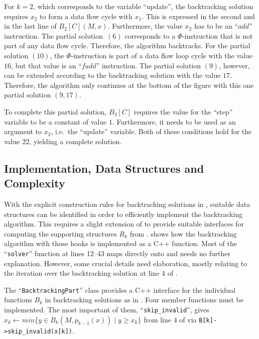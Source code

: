     For $k=2$, which corresponds to the variable ``update'', the backtracking
    solution requires $x_2$ to form a data flow cycle with $x_1$.
    This is expressed  in the second and in the last line of $B_2[C](M,x)$.
    Furthermore, the value $x_2$ has to be an ``$add$'' instruction.
    The partial solution~$(6)$ corresponds to a $\Phi$-instruction that is not
    part of any data flow cycle.
    Therefore, the algorithm backtracks.
    For the partial solution $(10)$, the $\Phi$-instruction is part of a data
    flow loop cycle with the value $16$, but that value is an ``$fadd$''
    instruction.
    The partial solution $(9)$, however, can be extended according to the
    backtracking solution with the value $17$.
    Therefore, the algorithm only continues at the bottom of the figure with
    this one partial solution $(9,17)$.

    To complete this partial solution, $B_3[C]$ requires the value for the
    ``step'' variable to be a constant of value $1$.
    Furthermore, it needs to be used as an argument to $x_2$, i.e.\ the
    ``update'' variable.
    Both of these conditions hold for the value $22$, yielding a complete
    solution.

\subsection{Implementation, Data Structures and Complexity}
\label{subsec:impl}

\begin{figure}[p]
    
\end{figure}

    With the explicit construction rules for backtracking solutions in
    , suitable data structures
    can be identified in order to efficiently implement the
    backtracking algorithm.
    This requires a slight extension of  to provide suitable
    interfaces for computing the supporting structures $R_k$ from
    .
     shows how the backtracking algorithm with those hooks is
    implemented as a C++ function.
    Most of the ``\texttt{solver}'' function at lines 12--43 maps directly onto
     and needs no further explanation.
    However, some crucial details need elaboration, mostly relating to the
    iteration over the backtracking solution at line 4 of .

    The ``\texttt{BacktrackingPart}'' class provides a C++ interface
    for the individual functions $B_k$ in backtracking solutions as in
    .
    Four member functions must be implemented.
    The most important of them, ``\texttt{skip\_invalid}'',
    gives $x_k\gets min\{y\in B_k(M,p_{k-1}(x))\mid y\geq x_k\}$
    from line 4 of  via
    \texttt{B[k]->skip\_invalid(x[k])}.

